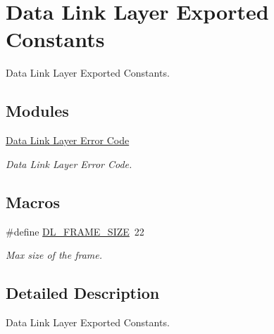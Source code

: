 \hypertarget{group___d_l___exported___constants}{}\section{Data Link Layer Exported Constants}
\label{group___d_l___exported___constants}


Data Link Layer Exported Constants.  


\subsection*{Modules}
\begin{DoxyCompactItemize}
\item 
\hyperlink{group___d_l___error___code}{Data Link Layer Error Code}
\begin{DoxyCompactList}\small\item\em Data Link Layer Error Code. \end{DoxyCompactList}\end{DoxyCompactItemize}
\subsection*{Macros}
\begin{DoxyCompactItemize}
\item 
\#define \hyperlink{group___d_l___exported___constants_ga791725f38bba0e3b69ff39b6eb8c748d}{D\+L\+\_\+\+F\+R\+A\+M\+E\+\_\+\+S\+I\+ZE}~22\hypertarget{group___d_l___exported___constants_ga791725f38bba0e3b69ff39b6eb8c748d}{}\label{group___d_l___exported___constants_ga791725f38bba0e3b69ff39b6eb8c748d}

\begin{DoxyCompactList}\small\item\em Max size of the frame. \end{DoxyCompactList}\end{DoxyCompactItemize}


\subsection{Detailed Description}
Data Link Layer Exported Constants. 

